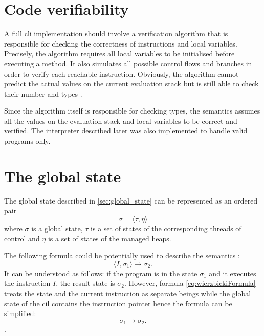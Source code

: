 \documentclass[declaration,shortabstract,english,mgr]{iithesis}
\begin{document}
\section{Code verifiability}
\label{sec:codeVerifiability}

A full \acrshort{cli} implementation should involve a verification algorithm that is responsible for checking the correctness of instructions and local variables. Precisely, the algorithm requires all local variables to be initialised before executing a method. It also simulates all possible control flows and branches in order to verify each reachable instruction. Obviously, the algorithm cannot predict the actual values on the current evaluation stack but is still able to check their number and types \cite{expertIl}.

Since the algorithm itself is responsible for checking types, the semantics assumes all the values on the evaluation stack and local variables to be correct and verified. The interpreter described later was also implemented to handle valid programs only.

\section{The global state}

The global state described in \ref{sec:global_state} can be represented as an ordered pair
\begin{equation}
	\sigma = \langle\tau, \eta\rangle
\end{equation}
where $\sigma$ is a global state, $\tau$ is a set of states of the corresponding threads of control and $\eta$ is a set of states of the managed heaps.

The following formula could be potentially used to describe the semantics \cite{wierzbicki}:
\begin{equation}
\label{eq:wierzbickiFormula}
	\langle I, \sigma_1\rangle \rightarrow \sigma_2.
\end{equation}
It can be understood as follows: if the program is in the state $\sigma_1$ and it executes the instruction $I$, the result state is $\sigma_2$. However, formula \ref{eq:wierzbickiFormula} treats the state and the current instruction as separate beings while the global state of the \acrshort{cil} contains the instruction pointer hence the formula can be simplified:
\begin{equation}
\label{eq:wierzbickiFormula2}
	\sigma_1 \rightarrow \sigma_2.
\end{equation}.
\end{document}
